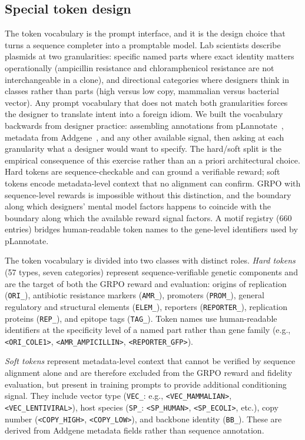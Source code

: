 \documentclass{article}
\begin{document}
\subsection{Special token design}
\label{sec:tokens}

The token vocabulary is the prompt interface, and it is the design choice that turns a
sequence completer into a promptable model. Lab scientists describe plasmids at two
granularities: specific named parts where exact identity matters operationally
(ampicillin resistance and chloramphenicol resistance are not interchangeable in a
clone), and directional categories where designers think in classes rather than parts
(high versus low copy, mammalian versus bacterial vector). Any prompt vocabulary that
does not match both granularities forces the designer to translate intent into a
foreign idiom. We built the vocabulary backwards from designer practice: assembling
annotations from pLannotate~\citep{mcguffie2021plannotate}, metadata from
Addgene~\citep{addgene2024}, and any other available signal, then asking at each
granularity what a designer would want to specify. The hard/soft split is the empirical
consequence of this exercise rather than an a priori architectural choice. Hard tokens
are sequence-checkable and can ground a verifiable reward; soft tokens encode
metadata-level context that no alignment can confirm. GRPO with sequence-level rewards
is impossible without this distinction, and the boundary along which designers' mental
model factors happens to coincide with the boundary along which the available reward
signal factors. A motif registry ($660$ entries) bridges human-readable token names to
the gene-level identifiers used by pLannotate.

The token vocabulary is divided into two classes with distinct roles. \emph{Hard tokens}
(57 types, seven categories) represent sequence-verifiable genetic components and are the
target of both the GRPO reward and evaluation: origins of replication (\texttt{ORI\_}),
antibiotic resistance markers (\texttt{AMR\_}), promoters (\texttt{PROM\_}), general
regulatory and structural elements (\texttt{ELEM\_}), reporters (\texttt{REPORTER\_}),
replication proteins (\texttt{REP\_}), and epitope tags (\texttt{TAG\_}). Token names use
human-readable identifiers at the specificity level of a named part rather than gene
family (e.g., \texttt{<ORI\_COLE1>}, \texttt{<AMR\_AMPICILLIN>}, \texttt{<REPORTER\_GFP>}).

\emph{Soft tokens} represent metadata-level context that cannot be verified by sequence
alignment alone and are therefore excluded from the GRPO reward and fidelity evaluation,
but present in training prompts to provide additional conditioning signal. They include
vector type (\texttt{VEC\_}: e.g., \texttt{<VEC\_MAMMALIAN>},
\texttt{<VEC\_LENTIVIRAL>}), host species (\texttt{SP\_}: \texttt{<SP\_HUMAN>},
\texttt{<SP\_ECOLI>}, etc.), copy number (\texttt{<COPY\_HIGH>}, \texttt{<COPY\_LOW>}),
and backbone identity (\texttt{BB\_}). These are derived from Addgene metadata fields
rather than sequence annotation.
\end{document}

